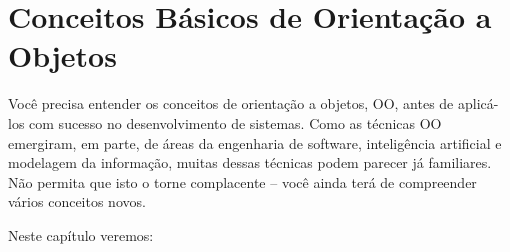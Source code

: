 \documentclass[
	11pt,				%
	openright,
	twoside,			%
	a4paper,			%
	english,			%
	french,
	brazil,				%
	sumario=tradicional
	]{abntex2}
\begin{document}

\frenchspacing 


\imprimircapa

\tableofcontents*
\cleardoublepage

%

\textual


\chapter{Conceitos Básicos de Orientação a Objetos}

Você precisa entender os conceitos de orientação a objetos, OO, antes de aplicá-los com sucesso no desenvolvimento de sistemas. Como as técnicas OO emergiram, em parte, de áreas da engenharia de software, inteligência artificial e modelagem da informação, muitas dessas técnicas podem parecer já familiares. Não permita que isto o torne complacente -- você ainda terá de compreender vários conceitos novos.

Neste capítulo veremos:
\end{document}
